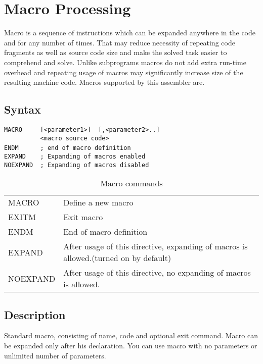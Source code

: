 \section{Macro Processing}
    Macro is a sequence of instructions which can be expanded anywhere in the code and for any number of times. That may reduce necessity of repeating code fragments as well as source code size and make the solved task easier to comprehend and solve. Unlike subprograms macros do not add extra run-time overhead and repeating usage of macros may significantly increase size of the resulting machine code. Macros supported by this assembler are.

    \subsection{Syntax}
        \verb'MACRO     [<parameter1>]  [,<parameter2>..]'\\
        \verb'          <macro source code>'\\
        \verb'ENDM      ; end of macro definition'
        \verb''~\\
        \verb'EXPAND    ; Expanding of macros enabled'\\
        \verb'NOEXPAND  ; Expanding of macros disabled'

        \begin{table}[h!]
            \begin{tabular}{|ll|}
                \hline
                MACRO      & Define a new macro \\
                EXITM      & Exit macro  \\
                ENDM       & End of macro definition \\
                EXPAND     & After usage of this directive, expanding of macros is allowed.(turned on by default)\\
                NOEXPAND   & After usage of this directive, no expanding of macros is allowed.\\
                \hline
            \end{tabular}
            \caption{Macro commands}
        \end{table}

    \subsection{Description}
        Standard macro, consisting of name, code and optional exit command. Macro can be expanded only after his declaration. You can use macro with no parameters  or unlimited number of parameters.

